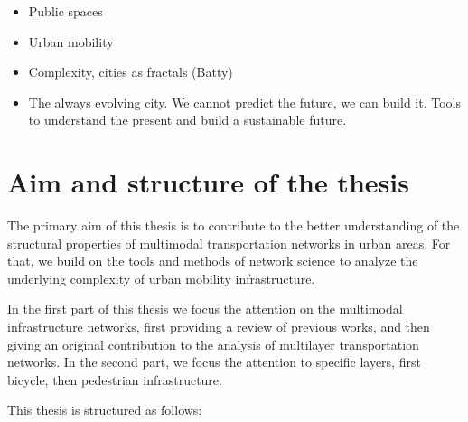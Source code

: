 \begin{itemize}
    \item Public spaces
    \item Urban mobility
    \item Complexity, cities as fractals (Batty)
    \item The always evolving city. We cannot predict the future, we can build it. Tools to understand the present and build a sustainable future.
\end{itemize}



\section{Aim and structure of the thesis}


The primary aim of this thesis is to contribute to the better understanding of the structural properties of multimodal transportation networks in urban areas. For that, we build on the tools and methods of network science to analyze the underlying complexity of urban mobility infrastructure. 

In the first part of this thesis we focus the attention on the multimodal infrastructure networks, first providing a review of previous works, and then giving an original contribution to the analysis of multilayer transportation networks. In the second part, we focus the attention to specific layers, first bicycle, then pedestrian infrastructure.

This thesis is structured as follows:

